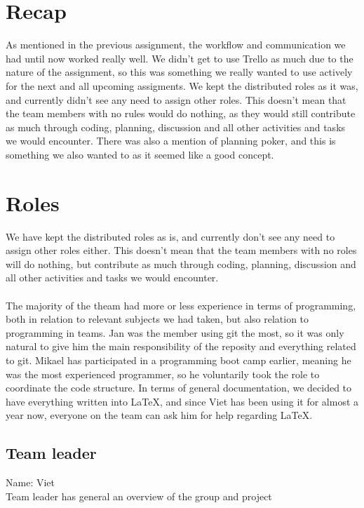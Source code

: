 \documentclass{article}
\begin{document}
\maketitle

\section*{Recap}
As mentioned in the previous assignment, the workflow and communication we had until now worked really well. We didn't get to use Trello as much due to the nature of the assignment, so this was something we really wanted to use actively for the next and all upcoming assigments.
We kept the distributed roles as it was, and currently didn't see any need to assign other roles. This doesn't mean that the team members with no rules would do nothing, as they would still contribute as much through coding, planning, discussion and all other activities and tasks we would encounter.
There was also a mention of planning poker, and this is something we also wanted to as it seemed like a good concept.

\section*{Roles}
We have kept the distributed roles as is, and currently don't see any need to assign other roles either. This doesn't mean that the team members with no roles will do nothing, but contribute as much through coding, planning, discussion and all other activities and tasks we would encounter.\\\\
The majority of the theam had more or less experience in terms of programming, both in relation to relevant subjects we had taken, but also relation to programming in teams. Jan was the member using git the most, so it was only natural to give him the main responsibility of the reposity and everything related to git. Mikael has participated in a programming boot camp earlier, meaning he was the most experienced programmer, so he voluntarily took the role to coordinate the code structure. In terms of general documentation, we decided to have everything written into LaTeX, and since Viet has been using it for almost a year now, everyone on the team can ask him for help regarding LaTeX.

\subsection*{Team leader}
Name: Viet\\
Team leader has general an overview of the group and project
\end{document}
